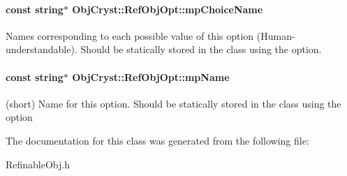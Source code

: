 \paragraph[{mpChoiceName}]{\setlength{\rightskip}{0pt plus 5cm}const string$\ast$ {\bf ObjCryst::RefObjOpt::mpChoiceName}\hspace{0.3cm}{\ttfamily  [protected]}}\hfill\label{a00077_abc47d0f345c4121b6492e754b30f4fef}


Names corresponding to each possible value of this option (Human-\/understandable). Should be statically stored in the class using the option. 
\paragraph[{mpName}]{\setlength{\rightskip}{0pt plus 5cm}const string$\ast$ {\bf ObjCryst::RefObjOpt::mpName}\hspace{0.3cm}{\ttfamily  [protected]}}\hfill\label{a00077_a45eb6eed7f6578f438433acddb2f1eb2}


(short) Name for this option. Should be statically stored in the class using the option 

The documentation for this class was generated from the following file:\begin{DoxyCompactItemize}
\item 
RefinableObj.h\end{DoxyCompactItemize}
